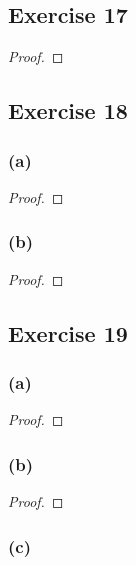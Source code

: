 \documentclass[14pt]{extarticle}
\begin{document}
\subsection{Exercise 17}

\begin{proof}

\end{proof}

\subsection{Exercise 18}

\subsubsection{(a)}

\begin{proof}

\end{proof}

\subsubsection{(b)}

\begin{proof}

\end{proof}

\subsection{Exercise 19}

\subsubsection{(a)}

\begin{proof}

\end{proof}

\subsubsection{(b)}

\begin{proof}

\end{proof}

\subsubsection{(c)}
\end{document}
